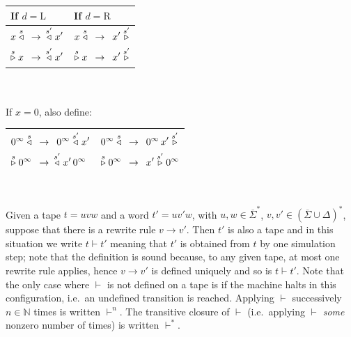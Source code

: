 \begin{table}[h!]
    \centering
    \begin{tabular}{l|l}
        If $d = \text{L}$                               & If $d = \text{R}$ \\
        \hline
        $\begin{aligned}[t]
                 x \stackrel{s}\triangleleft\,\,\, & \to \,\,\, \stackrel{s'}\triangleleft x' \\
                 \stackrel{s}\triangleright x\,\,\, & \to \,\,\, \stackrel{s'}\triangleleft x'
             \end{aligned}$ & $\begin{aligned}[t]
                                   x \stackrel{s}\triangleleft\,\,\, & \to \,\,\, x' \stackrel{s'}\triangleright \\
                                   \stackrel{s}\triangleright x\,\,\, & \to \,\,\, x' \stackrel{s'}\triangleright
                               \end{aligned}$     \\
        \hline
    \end{tabular}\\
    \ \\ If $x=0$, also define: \\
    \begin{tabular}{l|l}
        \hline
        $\begin{aligned}[t]
                 0^\infty \stackrel{s}\triangleleft\,\,\, & \to \,\,\, 0^\infty \stackrel{s'}\triangleleft x'   \\
                 \stackrel{s}\triangleright 0^\infty\,\,\, & \to \,\,\, \stackrel{s'}\triangleleft x'\, 0^\infty
             \end{aligned}$ & $\begin{aligned}[t]
                                   0^\infty \stackrel{s}\triangleleft\,\,\, & \to \,\,\, 0^\infty \, x' \stackrel{s'}\triangleright \\
                                   \stackrel{s}\triangleright 0^\infty\,\,\, & \to \,\,\, x' \stackrel{s'}\triangleright 0^\infty
                               \end{aligned}$ \\
        \hline
    \end{tabular}\\
\end{table}

Given a tape $t=uvw$ and a word $t'=uv'w$, with $u,w\in \overline{\Sigma}^*$, $v,v' \in ( \overline \Sigma \cup \Delta)^*$, suppose that there is a rewrite rule $v \to v'$. Then $t'$ is also a tape and in this situation we write $t \vdash t'$ meaning that $t'$ is obtained from $t$ by one simulation step; note that the definition is sound because, to any given tape, at most one rewrite rule applies, hence $v \to v'$ is defined uniquely and so is $t \vdash t'$. Note that the only case where $\vdash$ is not defined on a tape is if the machine halts in this configuration, i.e.\ an undefined transition is reached. Applying $\vdash$ successively $n\in\mathbb{N}$ times is written $\vdash^n$. The transitive closure of $\vdash$ (i.e.\ applying $\vdash$ \textit{some} nonzero number of times) is written $\vdash^*$.

